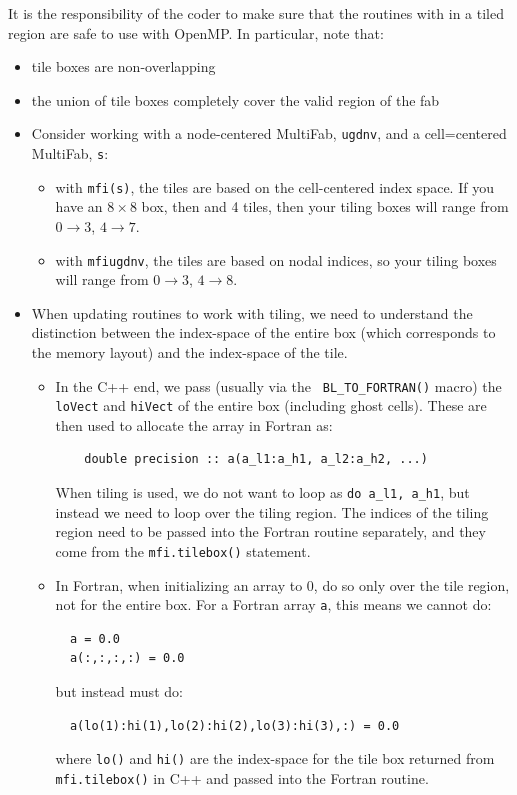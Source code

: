 It is the responsibility of the coder to make sure that the routines with
in a tiled region are safe to use with OpenMP.  In particular, note that:
\begin{itemize}
\item tile boxes are non-overlapping
\item the union of tile boxes completely cover the valid region of the fab
\item Consider working with a node-centered MultiFab, {\tt ugdnv}, and a
cell=centered MultiFab, {\tt s}:
  \begin{itemize}

  \item with {\tt mfi(s)}, the tiles are based on the cell-centered
  index space.  If you have an $8\times 8$ box, then and 4 tiles, then
  your tiling boxes will range from $0\rightarrow 3$, $4\rightarrow
  7$.

  \item with {\tt mfi{ugdnv}}, the tiles are based on nodal indices,
  so your tiling boxes will range from $0\rightarrow 3$, $4\rightarrow 8$.

  \end{itemize}  
\item When updating routines to work with tiling, we need to understand
the distinction between the index-space of the entire box (which
corresponds to the memory layout) and the index-space of the tile.

  \begin{itemize}

  \item In the C++ end, we pass (usually via the {\tt
  BL\_TO\_FORTRAN()} macro) the {\tt loVect} and {\tt hiVect} of the
  entire box (including ghost cells).  These are then used to allocate
  the array in Fortran as:
  \begin{lstlisting}
    double precision :: a(a_l1:a_h1, a_l2:a_h2, ...)
  \end{lstlisting}
  When tiling is used, we do not want to loop as {\tt do a\_l1, a\_h1},
  but instead we need to loop over the tiling region.  The indices of
  the tiling region need to be passed into the Fortran routine
  separately, and they come from the {\tt mfi.tilebox()} statement.

  \item In Fortran, when initializing an array to 0, do so only over
  the tile region, not for the entire box.  For a Fortran array {\tt a},
  this means we cannot do:
  \begin{lstlisting}
  a = 0.0
  a(:,:,:,:) = 0.0
  \end{lstlisting}
  but instead must do:
  \begin{lstlisting}
  a(lo(1):hi(1),lo(2):hi(2),lo(3):hi(3),:) = 0.0
  \end{lstlisting}
  where {\tt lo()} and {\tt hi()} are the index-space for the tile box
  returned from {\tt mfi.tilebox()} in C++ and passed into the Fortran
  routine.


\end{itemize}
\end{itemize}
